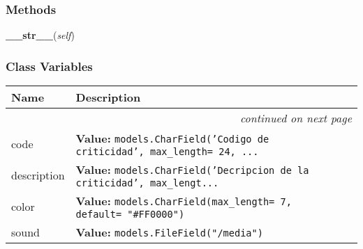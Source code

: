
  \subsubsection{Methods}

    \label{GroundSegment:models:Alarm:Criticity:Criticity:__str__}

    \vspace{0.5ex}

\hspace{.8\funcindent}\begin{boxedminipage}{\funcwidth}

    \raggedright \textbf{\_\_str\_\_}(\textit{self})

\setlength{\parskip}{2ex}
\setlength{\parskip}{1ex}
    \end{boxedminipage}



  \subsubsection{Class Variables}

    \vspace{-1cm}
\hspace{\varindent}\begin{longtable}{|p{\varnamewidth}|p{\vardescrwidth}|l}
\cline{1-2}
\cline{1-2} \centering \textbf{Name} & \centering \textbf{Description}& \\
\cline{1-2}
\endhead\cline{1-2}\multicolumn{3}{r}{\small\textit{continued on next page}}\\\endfoot\cline{1-2}
\endlastfoot\raggedright c\-o\-d\-e\- & \raggedright \textbf{Value:} 
{\tt models.CharField('Codigo de criticidad', max\_length= 24, \texttt{...}}&\\
\cline{1-2}
\raggedright d\-e\-s\-c\-r\-i\-p\-t\-i\-o\-n\- & \raggedright \textbf{Value:} 
{\tt models.CharField('Decripcion de la criticidad', max\_lengt\texttt{...}}&\\
\cline{1-2}
\raggedright c\-o\-l\-o\-r\- & \raggedright \textbf{Value:} 
{\tt models.CharField(max\_length= 7, default= "\#FF0000")}&\\
\cline{1-2}
\raggedright s\-o\-u\-n\-d\- & \raggedright \textbf{Value:} 
{\tt models.FileField("/media")}&\\
\cline{1-2}
\end{longtable}

